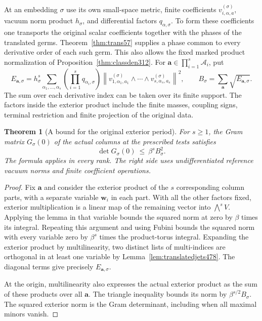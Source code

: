 \documentclass[a4paper,11pt]{article}
\newtheorem{theorem}[proposition]{Theorem}
\theoremstyle{definition}
\theoremstyle{remark}
\numberwithin{equation}{section}
\begin{document}
At an embedding \(\sigma\) use its own small-space metric,
finite coefficients \(v_{i,\alpha,a}^{(\sigma)}\), vacuum
norm product \(h_\sigma\), and differential factors
\(q_{\alpha,\sigma}\). To form these coefficients one transports
the original scalar coefficients together with the phases of the
translated germs. Theorem~\ref{thm:trans57} supplies a phase
common to every derivative order of each such germ. This also
allows the fixed marked product normalization of
Proposition~\ref{thm:classden312}. For
\(\boldsymbol a\in\prod_{i=1}^s\mathcal A_i\), put
\[
 E_{\boldsymbol a,\sigma}
 = h_\sigma^s\sum_{\alpha_1,\ldots,\alpha_s}
   \left(\prod_{i=1}^s q_{\alpha_i,\sigma}\right)
   \left\|v_{1,\alpha_1,a_1}^{(\sigma)}\wedge\cdots\wedge
           v_{s,\alpha_s,a_s}^{(\sigma)}\right\|^2,\qquad
 B_\sigma=\sum_{\boldsymbol a}\sqrt{E_{\boldsymbol a,\sigma}} .
\]
The sum over each derivative index can be taken over its finite
support. The factors inside the exterior product include the
finite masses, coupling signs, terminal restriction and finite
projection of the original data.

\begin{theorem}[A bound for the original exterior period]\leavevmode
\label{thm:fixedexterior479}
For \(s\ge1\), the Gram matrix \(G_\sigma(0)\) of the actual
columns at the prescribed tests satisfies
\[
                    \det G_\sigma(0)\ \le\ \beta^s B_\sigma^2 .
\]
The formula applies in every rank. The right side uses undifferentiated
reference vacuum norms and finite coefficient operations.
\end{theorem}
\begin{proof}
Fix \(\boldsymbol a\) and consider the exterior product of the
\(s\) corresponding column parts, with a separate variable
\(\boldsymbol w_i\) in each part. With all the other factors
fixed, exterior multiplication is a linear map of the remaining
vector into \(\bigwedge^s V\). Applying the lemma in that
variable bounds the squared norm at zero by \(\beta\) times
its integral. Repeating this argument and using Fubini bounds
the squared norm with every variable zero by \(\beta^s\) times
the product-torus integral. Expanding the exterior product by
multilinearity, two distinct lists of multi-indices are
orthogonal in at least one variable by
Lemma~\ref{lem:translatedjets478}. The diagonal terms give
precisely \(E_{\boldsymbol a,\sigma}\).

At the origin, multilinearity also expresses the actual exterior
product as the sum of these products over all \(\boldsymbol a\).
The triangle inequality bounds its norm by
\(\beta^{s/2}B_\sigma\). The squared exterior norm is the Gram
determinant, including when all maximal minors vanish.
\end{proof}
\end{document}
